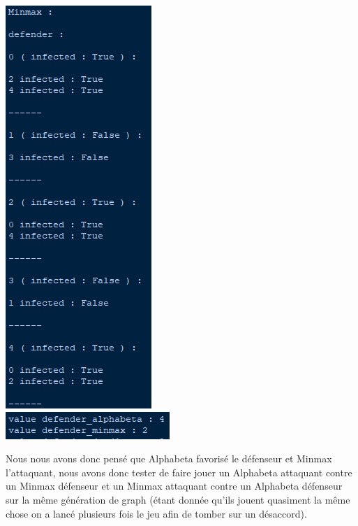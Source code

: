 \documentclass[a4paper,12pt]{article} %
\begin{document}
\begin{center}
\includegraphics[scale=0.7]{images/Capture4.PNG}\\
\includegraphics[scale=1]{images/Capture5.PNG}
\end{center}

Nous nous avons donc pensé que Alphabeta favorisé le défenseur et Minmax l'attaquant, nous avons donc tester de faire jouer un Alphabeta attaquant contre un Minmax défenseur et un Minmax attaquant contre un Alphabeta défenseur sur la même génération de graph (étant donnée qu'ils jouent quasiment la même chose on a lancé plusieurs fois le jeu afin de tomber sur un désaccord).
\end{document}
